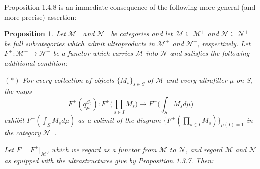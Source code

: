 \documentclass[11pt]{article}
\theoremstyle{plain}
\newtheorem{proposition}{Proposition}
\begin{document}

Proposition 1.4.8 is an immediate consequence of the following more general (and more precise) assertion:

\renewcommand{\theproposition}{1.4.9}
\begin{proposition}
Let $\mathcal{M}^+$ and $\mathcal{N}^+$ be categories and let $\mathcal{M} \subseteq \mathcal{M}^+$ and
$\mathcal{N} \subseteq \mathcal{N}^+$ be full subcategories which admit ultraproducts in $\mathcal{M}^+$ and
$\mathcal{N}^+$, respectively. Let $F^+ : \mathcal{M}^+ \to \mathcal{N}^+$ be a functor which carries
$\mathcal{M}$ into $\mathcal{N}$ and satisfies the following additional condition:

\smallskip
\noindent$(\ast)$ \emph{For every collection of objects $\{M_s\}_{s \in S}$ of $\mathcal{M}$ and every
ultrafilter $\mu$ on $S$, the maps}
\[
F^+(q_\mu^{S_0}) : F^+\Big(\prod_{s \in I} M_s\Big) \to F^+\Big(\int_S M_s d\mu\Big)
\]
\emph{exhibit $F^+(\int_S M_s d\mu)$ as a colimit of the diagram $\{F^+(\prod_{s \in I} M_s)\}_{\mu(I)=1}$
in the category $\mathcal{N}^+$.}
\smallskip


Let $F = F^+\vert_{\mathcal{M}}$, which we regard as a functor from $\mathcal{M}$ to $\mathcal{N}$, and
regard $\mathcal{M}$ and $\mathcal{N}$ as equipped with the ultrastructures \emph{give} by
Proposition 1.3.7. Then:



\end{proposition}
\end{document}
